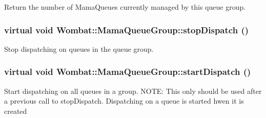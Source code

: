 Return the number of MamaQueues currently managed by this queue group. \hypertarget{classWombat_1_1MamaQueueGroup_a90a5e2596ebda29af5bd7bdcdbb63828}{
\subsubsection[{stopDispatch}]{\setlength{\rightskip}{0pt plus 5cm}virtual void Wombat::MamaQueueGroup::stopDispatch ()}}
\label{classWombat_1_1MamaQueueGroup_a90a5e2596ebda29af5bd7bdcdbb63828}


Stop dispatching on queues in the queue group. \hypertarget{classWombat_1_1MamaQueueGroup_a8b0bd3a030e0cc5cab54b2d3347dd47c}{
\subsubsection[{startDispatch}]{\setlength{\rightskip}{0pt plus 5cm}virtual void Wombat::MamaQueueGroup::startDispatch ()}}
\label{classWombat_1_1MamaQueueGroup_a8b0bd3a030e0cc5cab54b2d3347dd47c}


Start dispatching on all queues in a group. NOTE: This only should be used after a previous call to stopDispatch. Dispatching on a queue is started hwen it is created 